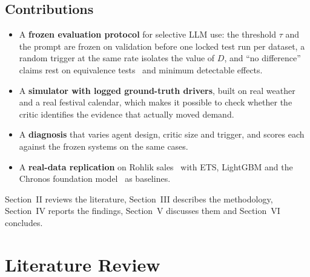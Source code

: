 \documentclass[conference]{IEEEtran}
\begin{document}
\subsection{Contributions}
\begin{itemize}
\item A \textbf{frozen evaluation protocol} for selective LLM use: the threshold $\tau$ and the
prompt are frozen on validation before one locked test run per dataset, a random trigger at the
same rate isolates the value of $D$, and ``no difference'' claims rest on equivalence
tests~\cite{schuirmann1987} and minimum detectable effects.
\item A \textbf{simulator with logged ground-truth drivers}, built on real weather~\cite{openmeteo}
and a real festival calendar, which makes it possible to check whether the critic identifies the
evidence that actually moved demand.
\item A \textbf{diagnosis} that varies agent design, critic size and trigger, and scores each against
the frozen systems on the same cases.
\item A \textbf{real-data replication} on Rohlik sales~\cite{rohlik} with ETS, LightGBM and the
Chronos foundation model~\cite{ansari2024} as baselines.
\end{itemize}

Section~II reviews the literature, Section~III describes the methodology, Section~IV reports the
findings, Section~V discusses them and Section~VI concludes.

\section{Literature Review}\label{sec:related}
\end{document}
